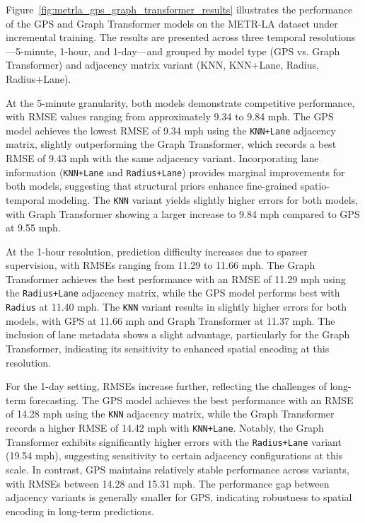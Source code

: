 \documentclass[runningheads]{llncs}
\begin{document}
Figure~\ref{fig:metrla_gps_graph_transformer_results} illustrates the performance of the GPS and Graph Transformer models on the METR-LA dataset under incremental training. The results are presented across three temporal resolutions—5-minute, 1-hour, and 1-day—and grouped by model type (GPS vs. Graph Transformer) and adjacency matrix variant (KNN, KNN+Lane, Radius, Radius+Lane).

At the 5-minute granularity, both models demonstrate competitive performance, with RMSE values ranging from approximately 9.34 to 9.84 mph. The GPS model achieves the lowest RMSE of 9.34 mph using the \texttt{KNN+Lane} adjacency matrix, slightly outperforming the Graph Transformer, which records a best RMSE of 9.43 mph with the same adjacency variant. Incorporating lane information (\texttt{KNN+Lane} and \texttt{Radius+Lane}) provides marginal improvements for both models, suggesting that structural priors enhance fine-grained spatio-temporal modeling. The \texttt{KNN} variant yields slightly higher errors for both models, with Graph Transformer showing a larger increase to 9.84 mph compared to GPS at 9.55 mph.

At the 1-hour resolution, prediction difficulty increases due to sparser supervision, with RMSEs ranging from 11.29 to 11.66 mph. The Graph Transformer achieves the best performance with an RMSE of 11.29 mph using the \texttt{Radius+Lane} adjacency matrix, while the GPS model performs best with \texttt{Radius} at 11.40 mph. The \texttt{KNN} variant results in slightly higher errors for both models, with GPS at 11.66 mph and Graph Transformer at 11.37 mph. The inclusion of lane metadata shows a slight advantage, particularly for the Graph Transformer, indicating its sensitivity to enhanced spatial encoding at this resolution.

For the 1-day setting, RMSEs increase further, reflecting the challenges of long-term forecasting. The GPS model achieves the best performance with an RMSE of 14.28 mph using the \texttt{KNN} adjacency matrix, while the Graph Transformer records a higher RMSE of 14.42 mph with \texttt{KNN+Lane}. Notably, the Graph Transformer exhibits significantly higher errors with the \texttt{Radius+Lane} variant (19.54 mph), suggesting sensitivity to certain adjacency configurations at this scale. In contrast, GPS maintains relatively stable performance across variants, with RMSEs between 14.28 and 15.31 mph. The performance gap between adjacency variants is generally smaller for GPS, indicating robustness to spatial encoding in long-term predictions.
\end{document}
